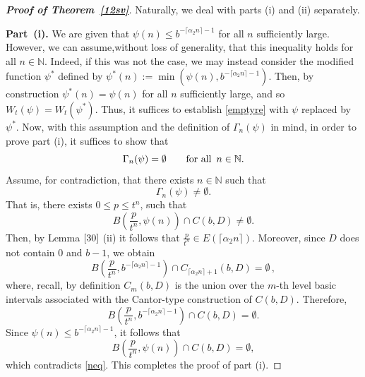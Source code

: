 \documentclass[12pt]{article}
\theoremstyle{definition}
\newcommand{\rmnum}[1]{\romannumeral #1}
\theoremstyle{remark}
\begin{document}
\begin{proof}[\rm \textbf{Proof of Theorem~\ref{12sv}}]  Naturally, we deal with parts (i) and (ii) separately. 
\medskip 


\noindent \textbf{Part~(i).}  We are given that $\psi(n)\leq b^{-\lceil \alpha_{2}n\rceil-1}$ for all $n$ sufficiently large. However,   we can assume,without loss of generality, that this inequality holds for all $n\in\mathbb{N}$.  Indeed, if this was not the case, we may  instead consider the modified function $\psi^*$ defined  by  $\psi^{*}(n):=\min(\psi(n),b^{-\lceil \alpha_{2}n\rceil-1})$.  Then,  by construction  $\psi^{*}(n)=\psi(n)$ for  all $n$ sufficiently large, and so 
$W_{t}(\psi)  = W_{t}(\psi^*)$.   Thus, it suffices to  establish \eqref{emptyre} with $\psi$ replaced by  $\psi^{*}$.  
Now, with this assumption and the definition of $\Gamma_{n}(\psi)$ in mind, in order to prove part (i), it suffices to show that   
$$\Gamma_{n}(\psi)=\emptyset    \qquad {\rm for \ all \ }  \, n\in\mathbb{N}.$$
Assume, for contradiction, that there exists $n\in\mathbb{N}$ such that
$$\Gamma_{n}(\psi)\neq\emptyset.$$
That is, there exists $0\leq p \leq t^{n}$, such that
\begin{equation}\label{neq}
B\left(\frac{p}{t^{n}},\psi(n)\right)\cap C(b,D)\neq\emptyset.   
\end{equation}
Then, by  Lemma $\ref{30}$ (ii)  it follows that  $\frac{p}{t^{n}}\in E(\lceil\alpha_{2}n\rceil)$.   Moreover, since   $D$ does not contain $0$ and $b-1$, we obtain  
$$B\left(\frac{p}{t^{n}},b^{-\lceil\alpha_{2}n\rceil-1}\right)\cap C_{\lceil \alpha_{2}n\rceil+1}(b,D)=\emptyset \, ,$$
where, recall, by definition   $C_m (b,D)$  is  the union over the $m$-th level basic intervals associated with the Cantor-type construction of $C (b,D)$.
Therefore, 
$$B\left(\frac{p}{t^{n}},b^{-\lceil\alpha_{2}n\rceil-1}\right)\cap C (b,D)=\emptyset.$$
Since $\psi(n)\leq b^{-\lceil \alpha_{2}n\rceil-1}$, it follows that
$$B\left(\frac{p}{t^{n}}, \psi(n)\right)\cap C (b,D)=\emptyset,$$
which contradicts \eqref{neq}. This completes the proof of part (i).





\end{proof}
\end{document}
